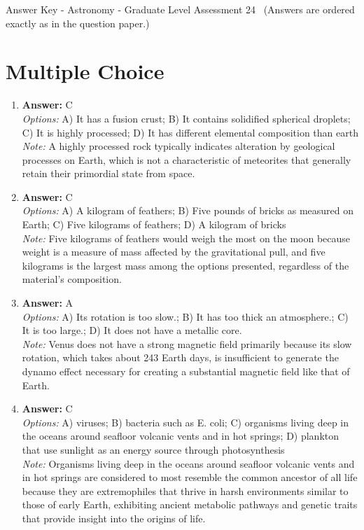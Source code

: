 \documentclass[12pt]{article}
\begin{document}
\begin{center}
Answer Key - Astronomy - Graduate Level Assessment 24 \
\small (Answers are ordered exactly as in the question paper.)
\end{center}

\section*{Multiple Choice}
\begin{enumerate}[label=\arabic*.]
\item \textbf{Answer:} C
\\ \textit{Options:} A) It has a fusion crust; B) It contains solidified spherical droplets; C) It is highly processed; D) It has different elemental composition than earth
\\ \textit{Note:} A highly processed rock typically indicates alteration by geological processes on Earth, which is not a characteristic of meteorites that generally retain their primordial state from space.
\item \textbf{Answer:} C
\\ \textit{Options:} A) A kilogram of feathers; B) Five pounds of bricks as measured on Earth; C) Five kilograms of feathers; D) A kilogram of bricks
\\ \textit{Note:} Five kilograms of feathers would weigh the most on the moon because weight is a measure of mass affected by the gravitational pull, and five kilograms is the largest mass among the options presented, regardless of the material's composition.
\item \textbf{Answer:} A
\\ \textit{Options:} A) Its rotation is too slow.; B) It has too thick an atmosphere.; C) It is too large.; D) It does not have a metallic core.
\\ \textit{Note:} Venus does not have a strong magnetic field primarily because its slow rotation, which takes about 243 Earth days, is insufficient to generate the dynamo effect necessary for creating a substantial magnetic field like that of Earth.
\item \textbf{Answer:} C
\\ \textit{Options:} A) viruses; B) bacteria such as E. coli; C) organisms living deep in the oceans around seafloor volcanic vents and in hot springs; D) plankton that use sunlight as an energy source through photosynthesis
\\ \textit{Note:} Organisms living deep in the oceans around seafloor volcanic vents and in hot springs are considered to most resemble the common ancestor of all life because they are extremophiles that thrive in harsh environments similar to those of early Earth, exhibiting ancient metabolic pathways and genetic traits that provide insight into the origins of life.

\end{enumerate}
\end{document}
